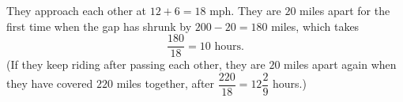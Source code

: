 They approach each other at $12+6=18$ mph. They are $20$ miles apart for the first time when the gap has shrunk by $200-20=180$ miles, which takes
\[
\dfrac{180}{18}=\boxed{10\text{ hours}}.
\]
(If they keep riding after passing each other, they are $20$ miles apart again when they have covered $220$ miles together, after $\dfrac{220}{18}=12\dfrac{2}{9}$ hours.)
